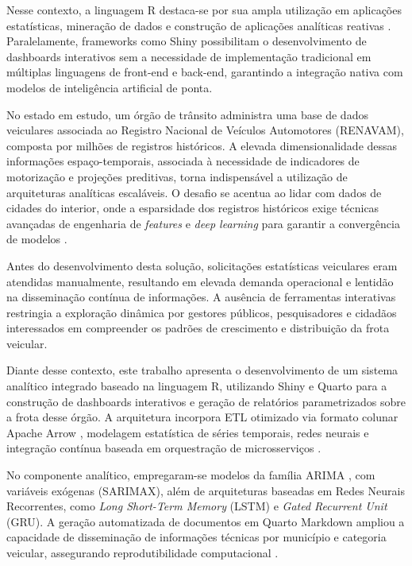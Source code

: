 \documentclass[10pt,conference]{IEEEtran}
\begin{document}
Nesse contexto, a linguagem R destaca-se por sua ampla utilização em aplicações estatísticas, mineração de dados e construção de aplicações analíticas reativas \cite{chang2026}. Paralelamente, frameworks como Shiny possibilitam o desenvolvimento de dashboards interativos sem a necessidade de implementação tradicional em múltiplas linguagens de front-end e back-end, garantindo a integração nativa com modelos de inteligência artificial de ponta.

No estado em estudo, um órgão de trânsito administra uma base de dados veiculares associada ao Registro Nacional de Veículos Automotores (RENAVAM), composta por milhões de registros históricos. A elevada dimensionalidade dessas informações espaço-temporais, associada à necessidade de indicadores de motorização e projeções preditivas, torna indispensável a utilização de arquiteturas analíticas escaláveis. O desafio se acentua ao lidar com dados de cidades do interior, onde a esparsidade dos registros históricos exige técnicas avançadas de engenharia de \textit{features} e \textit{deep learning} para garantir a convergência de modelos \cite{knaflic2019storytelling}.

Antes do desenvolvimento desta solução, solicitações estatísticas veiculares eram atendidas manualmente, resultando em elevada demanda operacional e lentidão na disseminação contínua de informações. A ausência de ferramentas interativas restringia a exploração dinâmica por gestores públicos, pesquisadores e cidadãos interessados em compreender os padrões de crescimento e distribuição da frota veicular.


Diante desse contexto, este trabalho apresenta o desenvolvimento de um sistema analítico integrado baseado na linguagem R, utilizando Shiny e Quarto para a construção de dashboards interativos e geração de relatórios parametrizados sobre a frota desse órgão. A arquitetura incorpora ETL otimizado via formato colunar Apache Arrow \cite{richardson2026}, modelagem estatística de séries temporais, redes neurais e integração contínua baseada em orquestração de microsserviços \cite{burns2016borgomega}.

No componente analítico, empregaram-se modelos da família ARIMA \cite{box1970time}, com variáveis exógenas (SARIMAX), além de arquiteturas baseadas em Redes Neurais Recorrentes, como \textit{Long Short-Term Memory} (LSTM) \cite{hochreiter1997} e \textit{Gated Recurrent Unit} (GRU). A geração automatizada de documentos em Quarto Markdown ampliou a capacidade de disseminação de informações técnicas por município e categoria veicular, assegurando reprodutibilidade computacional \cite{xie2018}.
\end{document}
